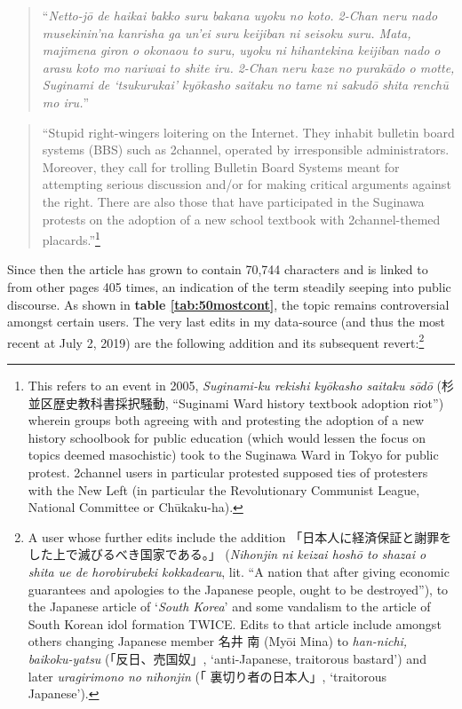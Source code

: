 \documentclass[10pt,british,A4paper,,openany]{memoir}
\begin{document}
\begin{quote}
``\emph{Netto-jō de haikai bakko suru bakana uyoku no koto. 2-Chan neru
nado musekinin'na kanrisha ga un'ei suru keijiban ni seisoku suru. Mata,
majimena giron o okonaou to suru, uyoku ni hihantekina keijiban nado o
arasu koto mo nariwai to shite iru. 2-Chan neru kaze no purakādo o
motte, Suginami de `tsukurukai' kyōkasho saitaku no tame ni sakudō shita
renchū mo iru.}''
\end{quote}

\begin{quote}
``Stupid right-wingers loitering on the Internet. They inhabit bulletin
board systems (BBS) such as 2channel, operated by irresponsible
administrators. Moreover, they call for trolling Bulletin Board Systems
meant for attempting serious discussion and/or for making critical
arguments against the right. There are also those that have participated
in the Suginawa protests on the adoption of a new school textbook with
2channel-themed placards.''\footnote{This refers to an event in 2005,
  \emph{Suginami-ku rekishi kyōkasho saitaku sōdō}
  (杉並区歴史教科書採択騒動, ``Suginami Ward history textbook adoption
  riot'') wherein groups both agreeing with and protesting the adoption
  of a new history schoolbook for public education (which would lessen
  the focus on topics deemed masochistic) took to the Suginawa Ward in
  Tokyo for public protest. 2channel users in particular protested
  supposed ties of protesters with the New Left (in particular the
  Revolutionary Communist League, National Committee or Chūkaku-ha).}
\end{quote}

Since then the article has grown to contain 70,744 characters and is
linked to from other pages 405 times, an indication of the term steadily
seeping into public discourse. As shown in \textbf{table
\ref{tab:50mostcont}}, the topic remains controversial amongst certain
users. The very last edits in my data-source (and thus the most recent
at July 2, 2019) are the following addition and its subsequent
revert:\footnote{A user whose further edits include the addition
  「日本人に経済保証と謝罪をした上で滅びるべき国家である。」
  (\emph{Nihonjin ni keizai hoshō to shazai o shita ue de horobirubeki
  kokkadearu}, lit. ``A nation that after giving economic guarantees and
  apologies to the Japanese people, ought to be destroyed''), to the
  Japanese article of `\emph{South Korea}' and some vandalism to the
  article of South Korean idol formation TWICE. Edits to that article
  include amongst others changing Japanese member 名井 南 (Myōi Mina) to
  \emph{han-nichi, baikoku-yatsu} (「反日、売国奴」, `anti-Japanese,
  traitorous bastard') and later \emph{uragirimono no nihonjin} (「
  裏切り者の日本人」, `traitorous Japanese').}
\end{document}
